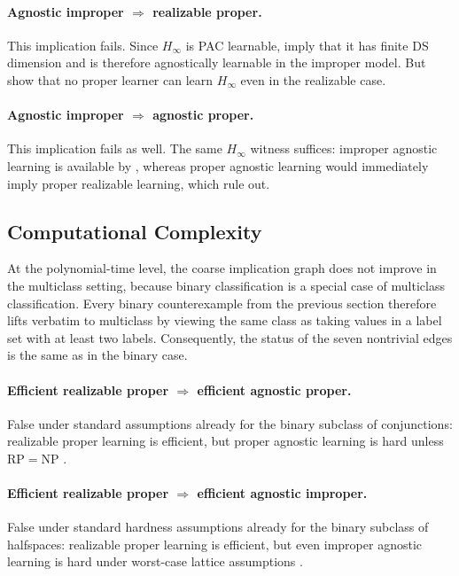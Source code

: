 \paragraph{Agnostic improper $\Rightarrow$ realizable proper.}
This implication fails. Since $H_\infty$ is PAC learnable, \citet{brukhim2022} imply that it has finite DS dimension and is therefore agnostically learnable in the improper model. But \citet[Theorem~1]{daniely2014optimal} show that no proper learner can learn $H_\infty$ even in the realizable case.

\paragraph{Agnostic improper $\Rightarrow$ agnostic proper.}
This implication fails as well. The same $H_\infty$ witness suffices: improper agnostic learning is available by \citet{brukhim2022}, whereas proper agnostic learning would immediately imply proper realizable learning, which \citet[Theorem~1]{daniely2014optimal} rule out.

\subsection{Computational Complexity}

At the polynomial-time level, the coarse implication graph does not improve in the multiclass setting, because binary classification is a special case of multiclass classification. Every binary counterexample from the previous section therefore lifts verbatim to multiclass by viewing the same class as taking values in a label set with at least two labels. Consequently, the status of the seven nontrivial edges is the same as in the binary case.

\paragraph{Efficient realizable proper $\Rightarrow$ efficient agnostic proper.}
False under standard assumptions already for the binary subclass of conjunctions: realizable proper learning is efficient, but proper agnostic learning is hard unless $\mathrm{RP}=\mathrm{NP}$ \citep{valiant1984,kearns1994}.

\paragraph{Efficient realizable proper $\Rightarrow$ efficient agnostic improper.}
False under standard hardness assumptions already for the binary subclass of halfspaces: realizable proper learning is efficient, but even improper agnostic learning is hard under worst-case lattice assumptions \citep{tiegel2023}.

